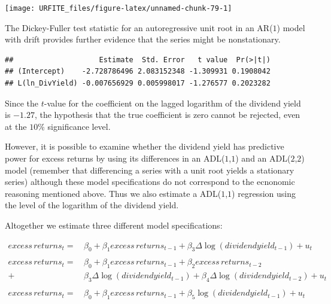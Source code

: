 \documentclass[]{book}
\newenvironment{Shaded}{\begin{snugshade}}{\end{snugshade}}
\newcommand{\KeywordTok}[1]{\textcolor[rgb]{0.13,0.29,0.53}{\textbf{#1}}}
\newcommand{\DataTypeTok}[1]{\textcolor[rgb]{0.13,0.29,0.53}{#1}}
\newcommand{\DecValTok}[1]{\textcolor[rgb]{0.00,0.00,0.81}{#1}}
\newcommand{\StringTok}[1]{\textcolor[rgb]{0.31,0.60,0.02}{#1}}
\newcommand{\CommentTok}[1]{\textcolor[rgb]{0.56,0.35,0.01}{\textit{#1}}}
\newcommand{\OperatorTok}[1]{\textcolor[rgb]{0.81,0.36,0.00}{\textbf{#1}}}
\newcommand{\NormalTok}[1]{#1}
\theoremstyle{definition}
\theoremstyle{definition}
\theoremstyle{definition}
\theoremstyle{remark}
\begin{document}
\begin{center}\texttt{[image: URFITE\_files/figure-latex/unnamed-chunk-79-1]} \end{center}

The Dickey-Fuller test statistic for an autoregressive unit root in an
AR(\(1\)) model with drift provides further evidence that the series
might be nonstationary.

\begin{Shaded}
\end{Shaded}

\begin{verbatim}
##                    Estimate  Std. Error   t value  Pr(>|t|)
## (Intercept)    -2.728786496 2.083152348 -1.309931 0.1908042
## L(ln_DivYield) -0.007656929 0.005998017 -1.276577 0.2023282
\end{verbatim}

Since the \(t\)-value for the coefficient on the lagged logarithm of the
dividend yield is \(-1.27\), the hypothesis that the true coefficient is
zero cannot be rejected, even at the \(10\%\) significance level.

However, it is possible to examine whether the dividend yield has
predictive power for excess returns by using its differences in an
ADL(\(1\),\(1\)) and an ADL(\(2\),\(2\)) model (remember that
differencing a series with a unit root yields a stationary series)
although these model specifications do not correspond to the ecnonomic
reasoning mentioned above. Thus we also estimate a ADL(\(1\),\(1\))
regression using the level of the logarithm of the dividend yield.

Altogether we estimate three different model specifications:

\begin{align*}
  excess \, returns_t =& \, \beta_0 + \beta_1 excess \, returns_{t-1} + \beta_3 \Delta \log(dividend yield_{t-1}) + u_t \\
  \\
  excess \, returns_t =& \, \beta_0 + \beta_1 excess \, returns_{t-1} + \beta_2 excess \, returns_{t-2} \\ +& \, \beta_3 \Delta \log(dividend yield_{t-1}) + \beta_4 \Delta \log(dividend yield_{t-2}) + u_t \\
  \\
  excess \, returns_t =& \, \beta_0 + \beta_1 excess \, returns_{t-1} + \beta_5 \log(dividend yield_{t-1}) + u_t \\
\end{align*}
\end{document}
